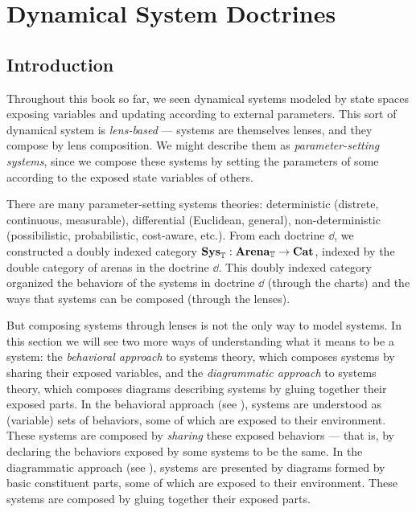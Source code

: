 \documentclass[DynamicalBook]{subfiles}
\begin{document}
%


\setcounter{chapter}{5}%

\chapter{Dynamical System Doctrines}\label{chapter.6}

\section{Introduction}


Throughout this book so far, we seen dynamical systems modeled by state spaces exposing
variables and updating according to external parameters. This sort of dynamical
system is \emph{lens-based} --- systems are themselves lenses, and they compose by
lens composition. We might describe them as \emph{parameter-setting systems},
since we compose these systems by setting the parameters of some according to
the exposed state variables of others.

There are many parameter-setting systems theories: deterministic (distrete, continuous, measurable), differential (Euclidean, general), non-deterministic (possibilistic, probabilistic, cost-aware, etc.). From each doctrine $\dd$, we constructed a doubly indexed category $\textbf{Sys}_{\mathbb{T}} : \textbf{Arena}_{\mathbb{T}} \to \textbf{Cat}$, indexed by the double category of arenas in the doctrine $\dd$. This doubly indexed category organized the behaviors of the systems in doctrine $\dd$ (through the charts) and the ways that systems can be composed (through the lenses).

But composing systems through lenses is not the only way to model systems. In this section we will see two more ways of understanding what it means to be a system: the \emph{behavioral approach} to systems theory, which composes systems by sharing their exposed variables, and the \emph{diagrammatic approach} to systems theory, which composes diagrams describing systems by gluing together their exposed parts. In the behavioral approach (see \cite{sec:behavioral.approach}), systems are understood as (variable) sets of behaviors, some of which are exposed to their environment. These systems are composed by \emph{sharing} these exposed behaviors --- that is, by declaring the behaviors exposed by some systems to be the same. In the diagrammatic approach (see \cite{sec:diagram.approach}), systems are presented by diagrams formed by basic constituent parts, some of which are exposed to their environment. These systems are composed by gluing together their exposed parts.
\end{document}
